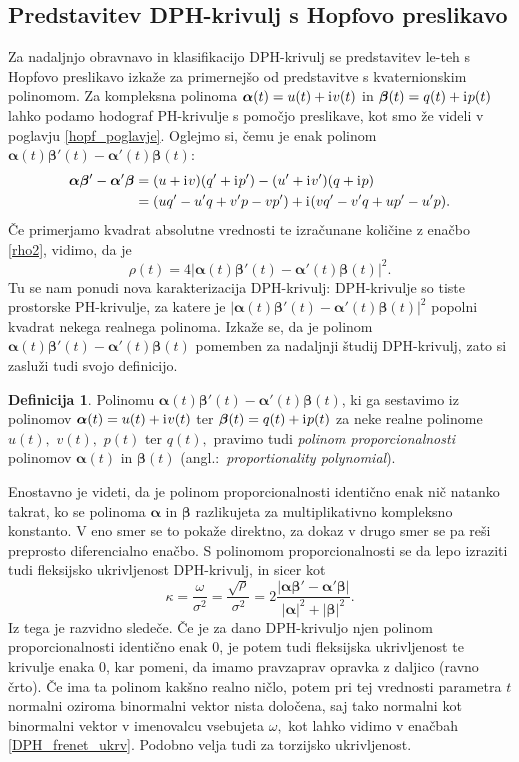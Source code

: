 \documentclass[12pt,a4paper,twoside]{article}
\newcommand{\iu}{\mathrm{i}\mkern1mu} %
\theoremstyle{definition} %
\newtheorem{definicija}{Definicija}[section]
\theoremstyle{plain} %
\theoremstyle{primerstyle}
\numberwithin{equation}{section}  %
\newcommand{\balpha}{\boldsymbol \alpha}
\newcommand{\bbeta}{\boldsymbol \beta}
\begin{document}
\subsection{Predstavitev DPH-krivulj s Hopfovo preslikavo}

Za nadaljnjo obravnavo in klasifikacijo DPH-krivulj se predstavitev le-teh s Hopfovo preslikavo izkaže za primernejšo od predstavitve s kvaternionskim polinomom. Za kompleksna polinoma $\balpha(t)=u(t)+\iu v(t)$ in $\bbeta(t)=q(t)+\iu p(t)$ lahko podamo hodograf PH-krivulje s pomočjo preslikave, kot smo že videli v poglavju \ref{hopf_poglavje}. Oglejmo si, čemu je enak polinom $\balpha(t)\bbeta'(t)-\balpha'(t)\bbeta(t)$:
\begin{align}
	\balpha\bbeta'-\balpha'\bbeta&=(u+\iu v)(q'+\iu p')-(u'+\iu v')(q+\iu p) \nonumber \\
	&=(uq'-u'q+v'p-vp')+\iu(vq'-v'q+up'-u'p).
\end{align}
Če primerjamo kvadrat absolutne vrednosti te izračunane količine z enačbo \eqref{rho2}, vidimo, da je
\begin{equation}
	\label{rho_propoly}
	\rho(t)=4|\balpha(t)\bbeta'(t)-\balpha'(t)\bbeta(t)|^2.
\end{equation}
Tu se nam ponudi nova karakterizacija DPH-krivulj: DPH-krivulje so tiste prostorske PH-krivulje, za katere je $|\balpha(t)\bbeta'(t)-\balpha'(t)\bbeta(t)|^2$ popolni kvadrat nekega realnega polinoma. Izkaže se, da je polinom $\balpha(t)\bbeta'(t)-\balpha'(t)\bbeta(t)$ pomemben za nadaljnji študij DPH-krivulj, zato si zasluži tudi svojo definicijo.
\begin{definicija}
	Polinomu $\balpha(t)\bbeta'(t)-\balpha'(t)\bbeta(t)$, ki ga sestavimo iz polinomov $\balpha(t)=u(t)+\iu v(t)$ ter $\bbeta(t)=q(t)+\iu p(t)$ za neke realne polinome $u(t),$ $v(t),$ $p(t)$ ter $q(t),$ pravimo tudi \emph{polinom proporcionalnosti} polinomov $\balpha(t)$ in $\bbeta(t)$ (angl.:\ \emph{proportionality polynomial}).
\end{definicija}
Enostavno je videti, da je polinom proporcionalnosti identično enak nič natanko takrat, ko se polinoma $\balpha$ in $\bbeta$ razlikujeta za multiplikativno kompleksno konstanto. V eno smer se to pokaže direktno, za dokaz v drugo smer se pa reši preprosto diferencialno enačbo.
S polinomom proporcionalnosti se da lepo izraziti tudi fleksijsko ukrivljenost DPH-krivulj, in sicer kot
\begin{equation}
	\label{kappa_propoly}
	\kappa=\frac{\omega}{\sigma^2}=\frac{\sqrt{\rho}}{\sigma^2}=2\frac{|\balpha\bbeta'-\balpha'\bbeta|}{|\balpha|^2+|\bbeta|^2}.
\end{equation}
Iz tega je razvidno sledeče. Če je za dano DPH-krivuljo njen polinom proporcionalnosti identično enak 0, je potem tudi fleksijska ukrivljenost te krivulje enaka 0, kar pomeni, da imamo pravzaprav opravka z daljico (ravno črto). Če ima ta polinom kakšno realno ničlo, potem pri tej vrednosti parametra $t$ normalni oziroma binormalni vektor nista določena, saj tako normalni kot binormalni vektor v imenovalcu vsebujeta $\omega,$ kot lahko vidimo v enačbah \eqref{DPH_frenet_ukrv}. Podobno velja tudi za torzijsko ukrivljenost.
\end{document}
